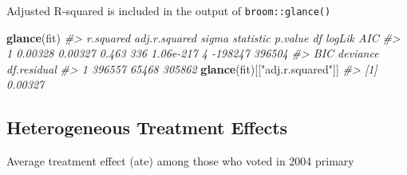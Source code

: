 \documentclass[]{book}
\newenvironment{Shaded}{\begin{snugshade}}{\end{snugshade}}
\newcommand{\CommentTok}[1]{\textcolor[rgb]{0.56,0.35,0.01}{\textit{#1}}}
\newcommand{\DataTypeTok}[1]{\textcolor[rgb]{0.13,0.29,0.53}{#1}}
\newcommand{\KeywordTok}[1]{\textcolor[rgb]{0.13,0.29,0.53}{\textbf{#1}}}
\newcommand{\NormalTok}[1]{#1}
\newcommand{\OperatorTok}[1]{\textcolor[rgb]{0.81,0.36,0.00}{\textbf{#1}}}
\newcommand{\StringTok}[1]{\textcolor[rgb]{0.31,0.60,0.02}{#1}}
\theoremstyle{definition}
\theoremstyle{definition}
\theoremstyle{definition}
\theoremstyle{remark}
\begin{document}
\begin{Shaded}
\end{Shaded}

Adjusted R-squared is included in the output of \texttt{broom::glance()}

\begin{Shaded}
\begin{Highlighting}[]
\KeywordTok{glance}\NormalTok{(fit)}
\CommentTok{#>   r.squared adj.r.squared sigma statistic   p.value df  logLik    AIC}
\CommentTok{#> 1   0.00328       0.00327 0.463       336 1.06e-217  4 -198247 396504}
\CommentTok{#>      BIC deviance df.residual}
\CommentTok{#> 1 396557    65468      305862}
\KeywordTok{glance}\NormalTok{(fit)[[}\StringTok{"adj.r.squared"}\NormalTok{]]}
\CommentTok{#> [1] 0.00327}
\end{Highlighting}
\end{Shaded}

\hypertarget{heterogeneous-treatment-effects}{%
\subsection{Heterogeneous Treatment
Effects}\label{heterogeneous-treatment-effects}}

Average treatment effect (ate) among those who voted in 2004 primary
\end{document}
